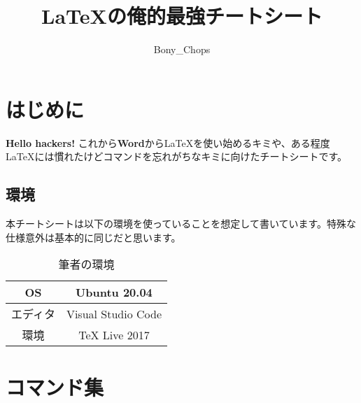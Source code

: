 \documentclass[a4j, titlepage]{jarticle}
\title{\LaTeX の俺的最強チートシート}
\author{Bony\_Chops}
\begin{document}
\maketitle

\setcounter{section}{-1}
\section{はじめに}
\textbf{Hello hackers!} これから\textbf{Word}から\LaTeX を使い始めるキミや、ある程度\LaTeX には慣れたけどコマンドを忘れがちなキミに向けたチートシートです。
\subsection{環境}
本チートシートは以下の環境を使っていることを想定して書いています。特殊な仕様意外は基本的に同じだと思います。

\begin{table*}[htbp]
    \center
    \caption{筆者の環境}
    \begin{tabular}{|c|c|} \hline
        OS & Ubuntu 20.04 \\ \hline
        エディタ & Visual Studio Code \\ \hline
        環境 & TeX Live 2017 \\ \hline
    \end{tabular}
\end{table*}

\section{コマンド集}
\end{document}
